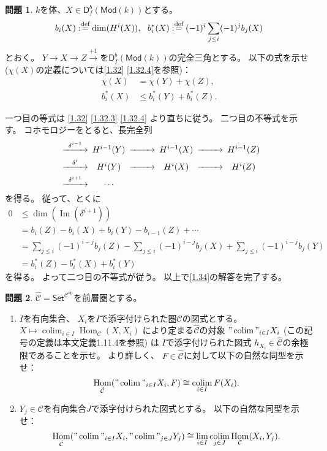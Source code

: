 \documentclass[uplatex,dvipdfmx]{jsarticle}
\makeatletter
\theoremstyle{definition}
\newtheorem{prob}[prob]{問題}
\renewenvironment{proof}[1][\proofname]{
  \pushQED{\qed}%
  \normalfont \topsep6\p@\@plus6\p@\relax
  \trivlist
  \item[\hskip\labelsep
    #1\@addpunct{\textbf{.}}]\ignorespaces
}{%
  \popQED\endtrivlist\@endpefalse
}
\providecommand{\proofname}{証明}
\DeclareMathOperator{\Hom}{\mathrm{Hom}}
\DeclareMathOperator{\im}{\mathrm{Im}}
\newcommand{\op}{\mathrm{op}}
\DeclareMathOperator{\colim}{\mathrm{colim}}
\newcommand{\Mod}{\mathsf{Mod}}
\newcommand{\sfD}{\mathsf{D}}
\newcommand\sfSet{\mathsf{Set}}
\newcommand\mcC{\mathcal{C}}
\def\dfn{:\overset{\mbox{{\scriptsize def}}}{=}}
\makeatother
\begin{document}
\begin{prob}\label{1.34}
  \(k\)を体、\(X\in \sfD^b_f(\Mod(k))\)とする。
  \[
  b_i(X) \dfn \dim(H^i(X)), \ \
  b_i^*(X) \dfn (-1)^i \sum_{j\leq i}(-1)^jb_j(X)
  \]
  とおく。
  \(Y\to X\to Z\xrightarrow{+1}\)を\(\sfD^b_f(\Mod(k))\)の完全三角とする。
  以下の式を示せ (\(\chi(X)\)の定義については\autoref{1.32} \ref{1.32.4}を参照)：
  \begin{align*}
    \chi(X) &= \chi(Y) + \chi(Z), \\
    b_i^*(X) &\leq b_i^*(Y) + b_i^*(Z).
  \end{align*}
\end{prob}

\begin{proof}
  一つ目の等式は
  \autoref{1.32} \ref{1.32.3} \ref{1.32.4}
  より直ちに従う。
  二つ目の不等式を示す。
  コホモロジーをとると、長完全列
  \[
  \begin{CD}
    @> \delta^{i-1} >> H^{i-1}(Y) @>>> H^{i-1}(X) @>>> H^{i-1}(Z) \\
    @> \delta^i >> H^i(Y) @>>> H^i(X) @>>> H^i(Z) \\
    @> \delta^{i+1} >> \cdots @. @.
  \end{CD}
  \]
  を得る。
  従って、とくに
  \begin{align*}
    0 &\leq \dim(\im(\delta^{i+1})) \\
    &= b_i(Z) - b_i(X) + b_i(Y) - b_{i-1}(Z) + \cdots \\
    &= \sum_{j\leq i}(-1)^{i-j}b_j(Z) - \sum_{j\leq i}(-1)^{i-j}b_j(X)
    + \sum_{j\leq i}(-1)^{i-j}b_j(Y) \\
    &= b_i^*(Z) - b_i^*(X) + b_i^*(Y)
  \end{align*}
  を得る。
  よって二つ目の不等式が従う。
  以上で\autoref{1.34}の解答を完了する。
\end{proof}





\begin{prob}\label{1.35}
  \(\hat{\mcC} = \sfSet^{\mcC^{\op}}\)を前層圏とする。
  \begin{enumerate}
    \item \label{1.35.1}
    \(I\)を有向集合、
    \(X_i\)を\(I\)で添字付けられた圏\(\mcC\)の図式とする。
    \(X\mapsto \colim_{i\in I}\Hom_{\mcC}(X,X_i)\)
    により定まる\(\hat{\mcC}\)の対象
    \("\colim"_{i\in I} X_i\)
    (この記号の定義は本文定義1.11.4を参照) は
    \(I\)で添字付けられた図式
    \(h_{X_i}\in \hat{\mcC}\)の余極限であることを示せ。
    より詳しく、
    \(F\in \hat{\mcC}\)に対して以下の自然な同型を示せ：
    \[
    \Hom_{\hat{\mcC}}("\colim"_{i\in I} X_i, F) \cong \colim_{i\in I} F(X_i).
    \]
    \item \label{1.35.2}
    \(Y_j\in \mcC\)を有向集合\(J\)で添字付けられた図式とする。
    以下の自然な同型を示せ：
    \[
    \Hom_{\hat{\mcC}}("\colim"_{i\in I} X_i, "\colim"_{j\in J} Y_j)
    \cong \lim_{i\in I}\colim_{j\in J}\Hom_{\mcC}(X_i,Y_j).
    \]
  \end{enumerate}
\end{prob}
\end{document}
